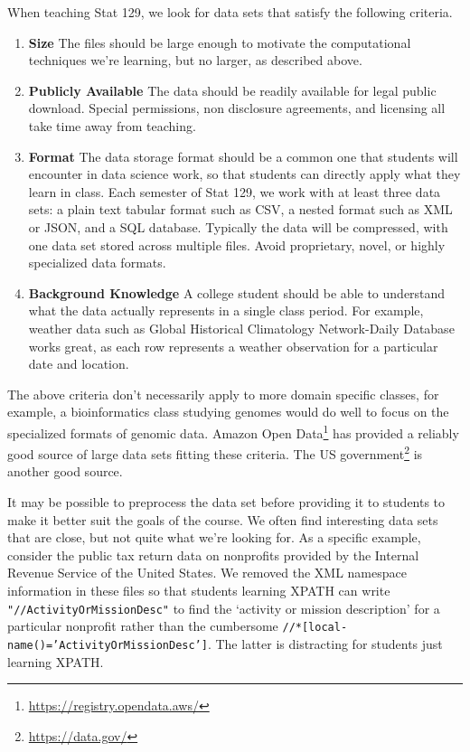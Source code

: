 \documentclass[12pt]{article}
\begin{document}
When teaching Stat 129, we look for data sets that satisfy the following criteria.
\begin{enumerate}
\item \textbf{Size} The files should be large enough to motivate the computational techniques we're learning, but no larger, as described above.
\item \textbf{Publicly Available} The data should be readily available for legal public download.
	Special permissions, non disclosure agreements, and licensing all take time away from teaching.
\item \textbf{Format} 
    The data storage format should be a common one that students will encounter in data science work, so that students can directly apply what they learn in class.
    Each semester of Stat 129, we work with at least three data sets: a plain text tabular format such as CSV, a nested format such as XML or JSON, and a SQL database.
    Typically the data will be compressed, with one data set stored across multiple files.
	Avoid proprietary, novel, or highly specialized data formats.
\item \textbf{Background Knowledge}
    A college student should be able to understand what the data actually represents in a single class period.
    For example, weather data such as Global Historical Climatology Network-Daily Database \cite{menne2012overview} works great, as each row represents a weather observation for a particular date and location.
\end{enumerate}
The above criteria don't necessarily apply to more domain specific classes, for example, a bioinformatics class studying genomes would do well to focus on the specialized formats of genomic data.
Amazon Open Data\footnote{\url{https://registry.opendata.aws/}} has provided a reliably good source of large data sets fitting these criteria. 
The US government\footnote{\url{https://data.gov/}} is another good source.

It may be possible to preprocess the data set before providing it to students to make it better suit the goals of the course.
We often find interesting data sets that are close, but not quite what we're looking for.
As a specific example, consider the public tax return data on nonprofits provided by the Internal Revenue Service of the United States\cite{irs990}.
We removed the XML namespace information in these files so that students learning XPATH can write \texttt{"//ActivityOrMissionDesc"} to find the `activity or mission description' for a particular nonprofit rather than the cumbersome \texttt{//*[local-name()='ActivityOrMissionDesc']}.
The latter is distracting for students just learning XPATH.
\end{document}
